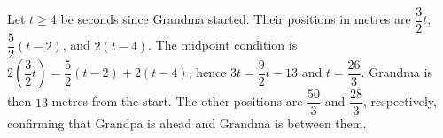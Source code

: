 Let $ t\ge4 $ be seconds since Grandma started. Their positions in metres are $\dfrac{3}{2}t $, $\dfrac{5}{2}(t-2)$, and $ 2(t-4)$. The midpoint condition is $ 2(\dfrac{3}{2}t)=\dfrac{5}{2}(t-2)+2(t-4)$, hence $ 3t=\dfrac{9}{2}t-13 $ and $ t=\dfrac{26}{3}$. Grandma is then $\boxed{13}$ metres from the start. The other positions are $\dfrac{50}{3}$ and $\dfrac{28}{3}$, respectively, confirming that Grandpa is ahead and Grandma is between them.
